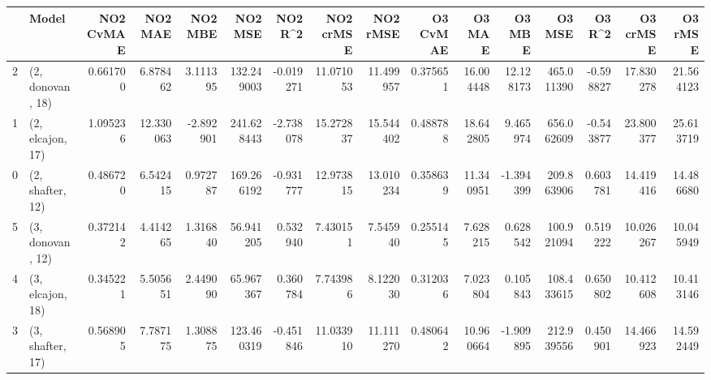 \begin{tabular}{llrrrrrrrrrrrrrr}
\toprule
{} &             Model &  NO2 CvMAE &    NO2 MAE &   NO2 MBE &     NO2 MSE &   NO2 R\textasciicircum2 &  NO2 crMSE &   NO2 rMSE &  O3 CvMAE &     O3 MAE &     O3 MBE &      O3 MSE &    O3 R\textasciicircum2 &   O3 crMSE &    O3 rMSE \\
\midrule
2 &  (2, donovan, 18) &   0.661700 &   6.878462 &  3.111395 &  132.249003 & -0.019271 &  11.071053 &  11.499957 &  0.375651 &  16.004448 &  12.128173 &  465.011390 & -0.598827 &  17.830278 &  21.564123 \\
1 &  (2, elcajon, 17) &   1.095236 &  12.330063 & -2.892901 &  241.628443 & -2.738078 &  15.272837 &  15.544402 &  0.488788 &  18.642805 &   9.465974 &  656.062609 & -0.543877 &  23.800377 &  25.613719 \\
0 &  (2, shafter, 12) &   0.486720 &   6.542415 &  0.972787 &  169.266192 & -0.931777 &  12.973815 &  13.010234 &  0.358639 &  11.340951 &  -1.394399 &  209.863906 &  0.603781 &  14.419416 &  14.486680 \\
5 &  (3, donovan, 12) &   0.372142 &   4.414265 &  1.316840 &   56.941205 &  0.532940 &   7.430151 &   7.545940 &  0.255145 &   7.628215 &   0.628542 &  100.921094 &  0.519222 &  10.026267 &  10.045949 \\
4 &  (3, elcajon, 18) &   0.345221 &   5.505651 &  2.449090 &   65.967367 &  0.360784 &   7.743986 &   8.122030 &  0.312036 &   7.023804 &   0.105843 &  108.433615 &  0.650802 &  10.412608 &  10.413146 \\
3 &  (3, shafter, 17) &   0.568905 &   7.787175 &  1.308875 &  123.460319 & -0.451846 &  11.033910 &  11.111270 &  0.480642 &  10.960664 &  -1.909895 &  212.939556 &  0.450901 &  14.466923 &  14.592449 \\
\bottomrule
\end{tabular}
